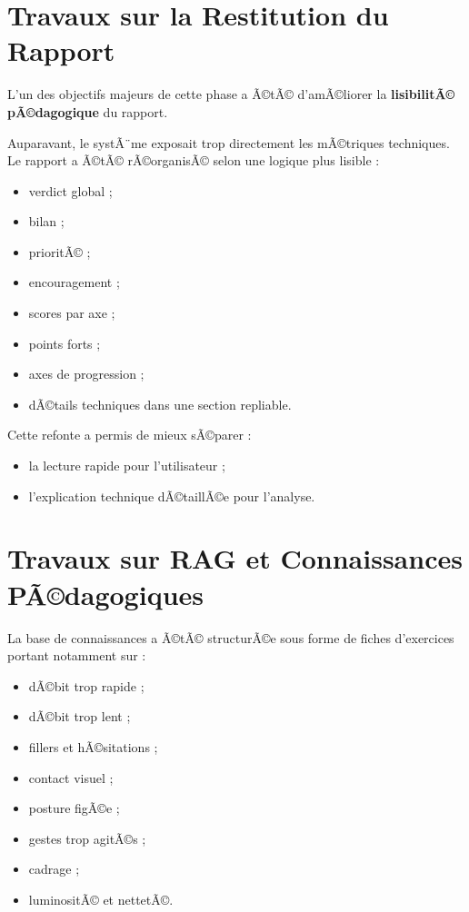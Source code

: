 ﻿\documentclass[12pt,a4paper]{article}
\begin{document}
\section{Travaux sur la Restitution du Rapport}
L'un des objectifs majeurs de cette phase a Ã©tÃ© d'amÃ©liorer la \textbf{lisibilitÃ© pÃ©dagogique} du rapport.

Auparavant, le systÃ¨me exposait trop directement les mÃ©triques techniques. Le rapport a Ã©tÃ© rÃ©organisÃ© selon une logique plus lisible :
\begin{itemize}
    \item verdict global ;
    \item bilan ;
    \item prioritÃ© ;
    \item encouragement ;
    \item scores par axe ;
    \item points forts ;
    \item axes de progression ;
    \item dÃ©tails techniques dans une section repliable.
\end{itemize}

Cette refonte a permis de mieux sÃ©parer :
\begin{itemize}
    \item la lecture rapide pour l'utilisateur ;
    \item l'explication technique dÃ©taillÃ©e pour l'analyse.
\end{itemize}

\section{Travaux sur RAG et Connaissances PÃ©dagogiques}
La base de connaissances a Ã©tÃ© structurÃ©e sous forme de fiches d'exercices portant notamment sur :
\begin{itemize}
    \item dÃ©bit trop rapide ;
    \item dÃ©bit trop lent ;
    \item fillers et hÃ©sitations ;
    \item contact visuel ;
    \item posture figÃ©e ;
    \item gestes trop agitÃ©s ;
    \item cadrage ;
    \item luminositÃ© et nettetÃ©.
\end{itemize}
\end{document}
